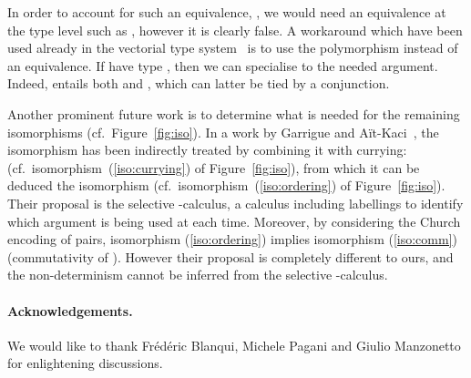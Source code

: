 \documentclass[final,copyright,creativecommons]{eptcs}
\theoremstyle{definition}
\begin{document}
In order to account for such an equivalence, , we would need an equivalence at the type level such as
,
however it is clearly false. A workaround which have been used already in the vectorial type system~\cite{ArrighiDiazcaroValironDCM11} is to use the polymorphism instead of an equivalence. If  have type , then we can specialise  to the needed argument. Indeed,
 entails both  and , which can latter be tied by a conjunction.
\medskip

Another prominent future work is to determine what is needed for the remaining isomorphisms (cf.~Figure~\ref{fig:iso}).
In a work by Garrigue and A\"it-Kaci~\cite{GarrigueAitkaciPOPL94}, the isomorphism  has been indirectly treated by combining it with currying:  (cf.~isomorphism~(\ref{iso:currying}) of Figure~\ref{fig:iso}), from which it can be deduced the isomorphism  (cf.~isomorphism~(\ref{iso:ordering}) of Figure~\ref{fig:iso}). Their proposal is the selective -calculus, a calculus including labellings to identify which argument is being used at each time. Moreover, by considering the Church encoding of pairs, isomorphism (\ref{iso:ordering}) implies isomorphism (\ref{iso:comm}) (commutativity of ). However their proposal is completely different to ours, and the non-determinism cannot be inferred from the selective -calculus.

\paragraph{Acknowledgements.} We would like to thank Fr\'ed\'eric Blanqui, Michele Pagani and Giulio Manzonetto for enlightening discussions.




\end{document}
